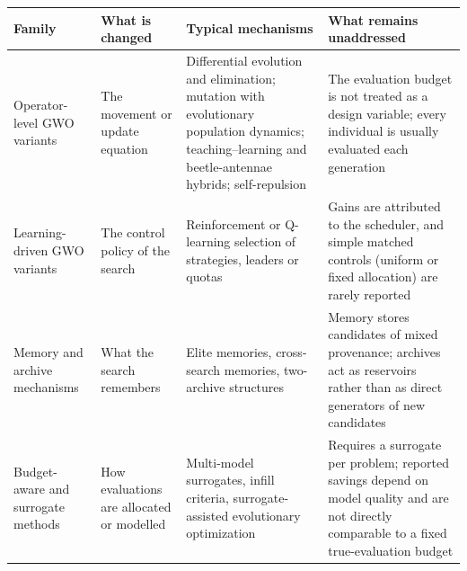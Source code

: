 \begin{tabular}{p{2.6cm}p{4.0cm}p{4.0cm}p{4.6cm}}
\toprule
Family & What is changed & Typical mechanisms & What remains unaddressed \\
\midrule
Operator-level GWO variants & The movement or update equation &
Differential evolution and elimination; mutation with evolutionary population
dynamics; teaching--learning and beetle-antennae hybrids; self-repulsion &
The evaluation budget is not treated as a design variable; every individual is
usually evaluated each generation \\
Learning-driven GWO variants & The control policy of the search &
Reinforcement or Q-learning selection of strategies, leaders or quotas &
Gains are attributed to the scheduler, and simple matched controls (uniform or
fixed allocation) are rarely reported \\
Memory and archive mechanisms & What the search remembers &
Elite memories, cross-search memories, two-archive structures &
Memory stores candidates of mixed provenance; archives act as reservoirs rather
than as direct generators of new candidates \\
Budget-aware and surrogate methods & How evaluations are allocated or modelled &
Multi-model surrogates, infill criteria, surrogate-assisted evolutionary
optimization &
Requires a surrogate per problem; reported savings depend on model quality and
are not directly comparable to a fixed true-evaluation budget \\
\bottomrule
\end{tabular}

